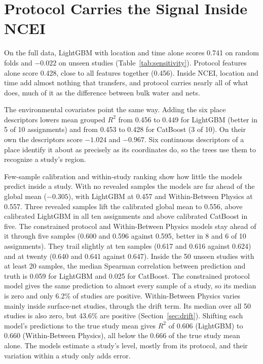 \documentclass[12pt,a4paper]{report}
\newcommand{\Rsq}{$R^2$}
\begin{document}
\section{Protocol Carries the Signal Inside NCEI}

On the full data, LightGBM with location and time alone scores 0.741 on random folds and $-0.022$ on unseen studies (Table~\ref{tab:sensitivity}). Protocol features alone score 0.428, close to all features together (0.456). Inside NCEI, location and time add almost nothing that transfers, and protocol carries nearly all of what does, much of it as the difference between bulk water and nets.

The environmental covariates point the same way. Adding the six place descriptors lowers mean grouped \Rsq{} from 0.456 to 0.449 for LightGBM (better in 5 of 10 assignments) and from 0.453 to 0.428 for CatBoost (3 of 10). On their own the descriptors score $-1.024$ and $-0.967$. Six continuous descriptors of a place identify it about as precisely as its coordinates do, so the trees use them to recognize a study's region.

Few-sample calibration and within-study ranking show how little the models predict inside a study. With no revealed samples the models are far ahead of the global mean ($-0.305$), with LightGBM at 0.457 and Within-Between Physics at 0.557. Three revealed samples lift the calibrated global mean to 0.556, above calibrated LightGBM in all ten assignments and above calibrated CatBoost in five. The constrained protocol and Within-Between Physics models stay ahead of it through five samples (0.600 and 0.596 against 0.595, better in 8 and 6 of 10 assignments). They trail slightly at ten samples (0.617 and 0.616 against 0.624) and at twenty (0.640 and 0.641 against 0.647). Inside the 50 unseen studies with at least 20 samples, the median Spearman correlation between prediction and truth is 0.059 for LightGBM and 0.025 for CatBoost. The constrained protocol model gives the same prediction to almost every sample of a study, so its median is zero and only 6.2\% of studies are positive. Within-Between Physics varies mainly inside surface-net studies, through the drift term. Its median over all 50 studies is also zero, but 43.6\% are positive (Section~\ref{sec:drift}). Shifting each model's predictions to the true study mean gives \Rsq{} of 0.606 (LightGBM) to 0.660 (Within-Between Physics), all below the 0.666 of the true study mean alone. The models estimate a study's level, mostly from its protocol, and their variation within a study only adds error.
\end{document}
